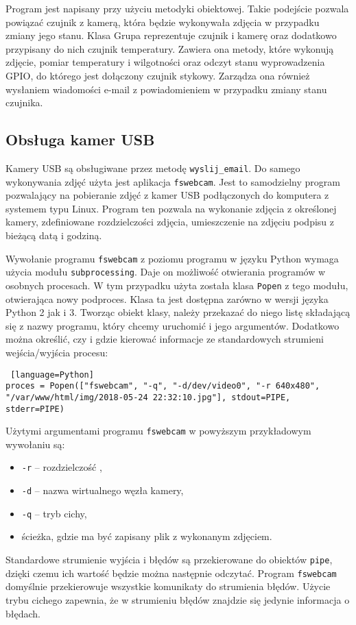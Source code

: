 \documentclass[a4paper,11pt,twoside]{article}
\begin{document}
Program jest napisany przy użyciu metodyki obiektowej. Takie podejście pozwala powiązać czujnik z kamerą, która będzie wykonywała zdjęcia w przypadku zmiany jego stanu. Klasa Grupa reprezentuje czujnik i kamerę oraz dodatkowo przypisany do nich czujnik temperatury. Zawiera ona metody, które wykonują zdjęcie, pomiar temperatury i wilgotności oraz odczyt stanu wyprowadzenia GPIO, do którego jest dołączony czujnik stykowy. Zarządza ona również wysłaniem wiadomości e-mail z powiadomieniem w przypadku zmiany stanu czujnika.

\subsection{Obsługa kamer USB}
Kamery USB są obsługiwane przez metodę \texttt{wyslij{\_}email}. Do samego wykonywania zdjęć użyta jest aplikacja \texttt{fswebcam}. Jest to samodzielny program pozwalający na pobieranie zdjęć z kamer USB podłączonych do komputera z systemem typu Linux. Program ten pozwala na wykonanie zdjęcia z określonej kamery, zdefiniowane rozdzielczości zdjęcia, umieszczenie na zdjęciu podpisu z bieżącą datą i godziną. 

Wywołanie programu \texttt{fswebcam} z poziomu programu w języku Python wymaga użycia modułu \texttt{subprocessing}. Daje on możliwość otwierania programów w osobnych procesach. W tym przypadku użyta została klasa \texttt{Popen} z tego modułu, otwierająca nowy podproces. Klasa ta jest dostępna zarówno w wersji języka Python 2 jak i 3. Tworząc obiekt klasy, należy przekazać do niego listę składającą się z nazwy programu, który chcemy uruchomić i jego argumentów. Dodatkowo można określić, czy i gdzie kierować informacje ze standardowych strumieni wejścia/wyjścia procesu:

\begin{lstlisting} [language=Python]
proces = Popen(["fswebcam", "-q", "-d/dev/video0", "-r 640x480", "/var/www/html/img/2018-05-24 22:32:10.jpg"], stdout=PIPE, stderr=PIPE)
\end{lstlisting}

Użytymi argumentami programu \texttt{fswebcam} w powyższym przykładowym wywołaniu są:
\begin{itemize}
\item \texttt{-r} -- rozdzielczość , 
\item \texttt{-d} -- nazwa wirtualnego węzła kamery,
\item \texttt{-q} -- tryb cichy,
\item ścieżka, gdzie ma być zapisany plik z wykonanym zdjęciem.
\end{itemize}
Standardowe strumienie wyjścia i błędów są przekierowane do obiektów \texttt{pipe}, dzięki czemu ich wartość będzie można następnie odczytać. Program \texttt{fswebcam} domyślnie przekierowuje wszystkie komunikaty do strumienia błędów. Użycie trybu cichego zapewnia, że w strumieniu błędów znajdzie się jedynie informacja o błędach.
\end{document}
